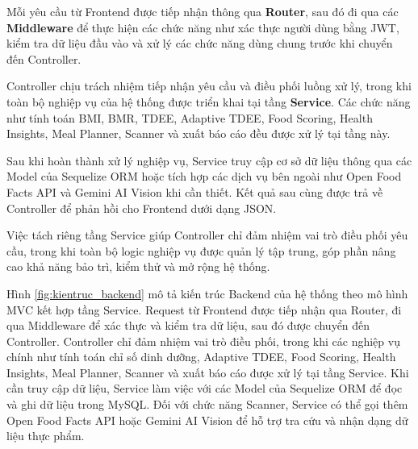\documentclass[12pt, a4paper]{report}
\begin{document}
Mỗi yêu cầu từ Frontend được tiếp nhận thông qua \textbf{Router}, sau đó đi qua các \textbf{Middleware} để thực hiện các chức năng như xác thực người dùng bằng JWT, kiểm tra dữ liệu đầu vào và xử lý các chức năng dùng chung trước khi chuyển đến Controller.

Controller chịu trách nhiệm tiếp nhận yêu cầu và điều phối luồng xử lý, trong khi toàn bộ nghiệp vụ của hệ thống được triển khai tại tầng \textbf{Service}. Các chức năng như tính toán BMI, BMR, TDEE, Adaptive TDEE, Food Scoring, Health Insights, Meal Planner, Scanner và xuất báo cáo đều được xử lý tại tầng này.

Sau khi hoàn thành xử lý nghiệp vụ, Service truy cập cơ sở dữ liệu thông qua các Model của Sequelize ORM hoặc tích hợp các dịch vụ bên ngoài như Open Food Facts API và Gemini AI Vision khi cần thiết. Kết quả sau cùng được trả về Controller để phản hồi cho Frontend dưới dạng JSON.

Việc tách riêng tầng Service giúp Controller chỉ đảm nhiệm vai trò điều phối yêu cầu, trong khi toàn bộ logic nghiệp vụ được quản lý tập trung, góp phần nâng cao khả năng bảo trì, kiểm thử và mở rộng hệ thống.

Hình \ref{fig:kientruc_backend} mô tả kiến trúc Backend của hệ thống theo mô hình MVC kết hợp tầng Service. Request từ Frontend được tiếp nhận qua Router, đi qua Middleware để xác thực và kiểm tra dữ liệu, sau đó được chuyển đến Controller. Controller chỉ đảm nhiệm vai trò điều phối, trong khi các nghiệp vụ chính như tính toán chỉ số dinh dưỡng, Adaptive TDEE, Food Scoring, Health Insights, Meal Planner, Scanner và xuất báo cáo được xử lý tại tầng Service. Khi cần truy cập dữ liệu, Service làm việc với các Model của Sequelize ORM để đọc và ghi dữ liệu trong MySQL. Đối với chức năng Scanner, Service có thể gọi thêm Open Food Facts API hoặc Gemini AI Vision để hỗ trợ tra cứu và nhận dạng dữ liệu thực phẩm.
\end{document}
